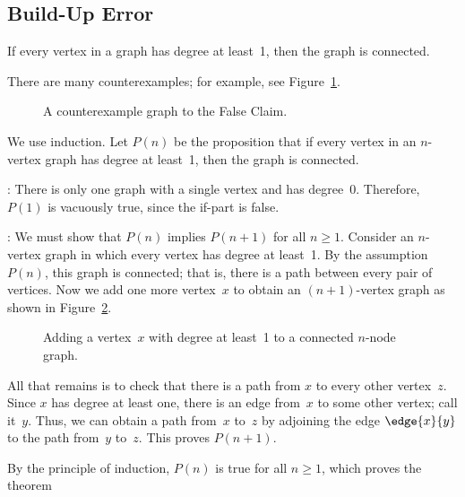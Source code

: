 \subsection{Build-Up Error}

\begin{falseclm*}
If every vertex in a graph has degree at least~1, then the graph is
connected.
\end{falseclm*}

There are many counterexamples; for example, see Figure~\ref{fig:5Z}.

\begin{figure}


\caption{A counterexample graph to the False Claim.}

\label{fig:5Z}
\end{figure}

\begin{bogusproof}
We use induction.  Let $P(n)$ be the proposition that if every vertex
in an $n$-vertex graph has degree at least~1, then the graph is
connected.

: There is only one graph with a single
vertex and has degree~0.  Therefore, $P(1)$ is vacuously true, since
the if-part is false.

: We must show that $P(n)$ implies
$P(n+1)$ for all $n \ge 1$.  Consider an $n$-vertex graph in which
every vertex has degree at least~1.  By the assumption~$P(n)$, this
graph is connected; that is, there is a path between every pair of
vertices.  Now we add one more vertex~$x$ to obtain an $(n+1)$-vertex
graph as shown in Figure~\ref{fig:5Y}.

\begin{figure}


\caption{Adding a vertex~$x$ with degree at least~1 to a connected
  $n$-node graph.}

\label{fig:5Y}

\end{figure}

All that remains is to check that there is a path from $x$ to every
other vertex~$z$.  Since $x$ has degree at least one, there is an edge
from~$x$ to some other vertex; call it~$y$.  Thus, we can obtain a
path from~$x$ to~$z$ by adjoining the edge $\edge{x}{y}$ to the path
from~$y$ to~$z$.  This proves $P(n + 1)$.

By the principle of induction, $P(n)$ is true for all  $n \ge 1$,
which proves the theorem
\end{bogusproof}

